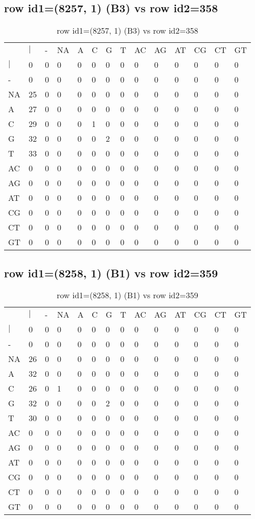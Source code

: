 \subsection{row id1=(8257, 1) (B3) vs row id2=358}
\begin{center}
\begin{longtable}{|l|l|l|l|l|l|l|l|l|l|l|l|l|l|}
\caption{row id1=(8257, 1) (B3) vs row id2=358} \label{table_dm206}\\
\hline
\\
\hline
&$|$&-&NA&A&C&G&T&AC&AG&AT&CG&CT&GT\\
$|$&0&0&0&0&0&0&0&0&0&0&0&0&0\\
-&0&0&0&0&0&0&0&0&0&0&0&0&0\\
NA&25&0&0&0&0&0&0&0&0&0&0&0&0\\
A&27&0&0&0&0&0&0&0&0&0&0&0&0\\
C&29&0&0&0&1&0&0&0&0&0&0&0&0\\
G&32&0&0&0&0&2&0&0&0&0&0&0&0\\
T&33&0&0&0&0&0&0&0&0&0&0&0&0\\
AC&0&0&0&0&0&0&0&0&0&0&0&0&0\\
AG&0&0&0&0&0&0&0&0&0&0&0&0&0\\
AT&0&0&0&0&0&0&0&0&0&0&0&0&0\\
CG&0&0&0&0&0&0&0&0&0&0&0&0&0\\
CT&0&0&0&0&0&0&0&0&0&0&0&0&0\\
GT&0&0&0&0&0&0&0&0&0&0&0&0&0\\
\hline
\end{longtable}
\end{center}

\subsection{row id1=(8258, 1) (B1) vs row id2=359}
\begin{center}
\begin{longtable}{|l|l|l|l|l|l|l|l|l|l|l|l|l|l|}
\caption{row id1=(8258, 1) (B1) vs row id2=359} \label{table_dm208}\\
\hline
\\
\hline
&$|$&-&NA&A&C&G&T&AC&AG&AT&CG&CT&GT\\
$|$&0&0&0&0&0&0&0&0&0&0&0&0&0\\
-&0&0&0&0&0&0&0&0&0&0&0&0&0\\
NA&26&0&0&0&0&0&0&0&0&0&0&0&0\\
A&32&0&0&0&0&0&0&0&0&0&0&0&0\\
C&26&0&1&0&0&0&0&0&0&0&0&0&0\\
G&32&0&0&0&0&2&0&0&0&0&0&0&0\\
T&30&0&0&0&0&0&0&0&0&0&0&0&0\\
AC&0&0&0&0&0&0&0&0&0&0&0&0&0\\
AG&0&0&0&0&0&0&0&0&0&0&0&0&0\\
AT&0&0&0&0&0&0&0&0&0&0&0&0&0\\
CG&0&0&0&0&0&0&0&0&0&0&0&0&0\\
CT&0&0&0&0&0&0&0&0&0&0&0&0&0\\
GT&0&0&0&0&0&0&0&0&0&0&0&0&0\\
\hline
\end{longtable}
\end{center}

